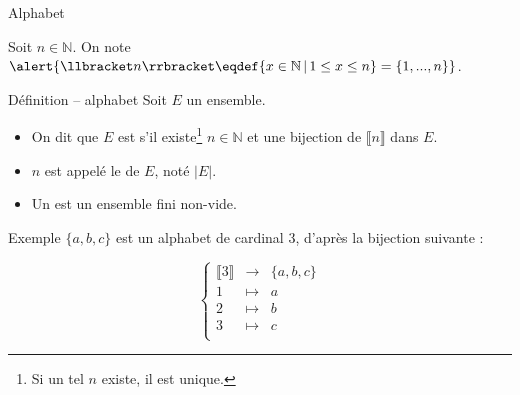 
\begingroup

\begin{frame}{Alphabet}
  
  Soit $n\in \mathbb{N}$. On note $\alert{\llbracket n\rrbracket \eqdef \{x\in \mathbb{N} \,|\, 1 \le x \le n\} = \{1, ..., n\}}$.
  
  \begin{block}{Définition -- alphabet}
    Soit $E$ un ensemble.
    \begin{itemize}
    \item On dit que $E$ est  s'il existe\footnote{Si un tel $n$ existe, il est unique.} $n\in \mathbb{N}$ et une bijection de $\llbracket n\rrbracket$ dans $E$. 
    \item $n$ est appelé le  de $E$, noté \alert{$|E|$}.
    \item Un  est un \alert{ensemble fini non-vide}. 
    \end{itemize}
  \end{block}

  \begin{exampleblock}{Exemple}
    $\{a, b, c\}$ est un alphabet de cardinal 3, d'après la bijection suivante :

    $$
    \left\{\begin{array}{ccl}
    \llbracket 3\rrbracket &\rightarrow& \{a, b, c\}\\
    1 &\mapsto& a\\ 
    2 &\mapsto& b\\ 
    3 &\mapsto& c\\ 
    \end{array}\right.
    $$
  \end{exampleblock}

\end{frame}

\endgroup
\endinput
